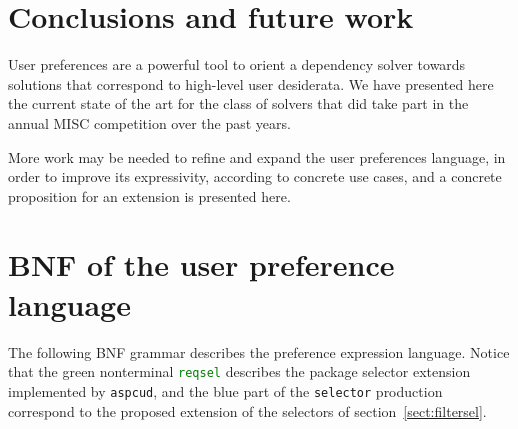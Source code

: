 \documentclass{article}
\newcommand{\aspcudext}[1]{{\textcolor{green}{#1}}}
\begin{document}
\section{Conclusions and future work}
User preferences are a powerful tool to orient a dependency solver towards solutions that correspond
to high-level user desiderata. We have presented here the current state of the art for the class of
solvers that did take part in the annual MISC competition over the past years.

More work may be needed to refine and expand the user preferences language, in order to improve its
expressivity, according to concrete use cases, and a concrete proposition for an extension is presented
here.

\nocite{packup-2010, MCCS-2010, aspcud-2011}

%



\appendix

\section{BNF of the user preference language}

The following BNF grammar describes the preference expression language. Notice that the green nonterminal \aspcudext{\texttt{reqsel}} describes
the package selector extension implemented by \texttt{aspcud}, and the blue part of the \texttt{selector} production correspond to the proposed
extension of the selectors of section~\ref{sect:filtersel}.
\end{document}

